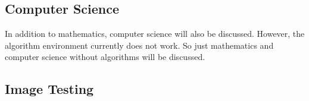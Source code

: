 \documentclass{article}
\begin{document}
\subsection*{Computer Science}

In addition to mathematics, computer science will also be discussed.
However, the algorithm environment currently does not work.
So just mathematics and computer science without algorithms will be discussed.

\subsection*{Image Testing}

\begin{center}
\end{center}
\end{document}
